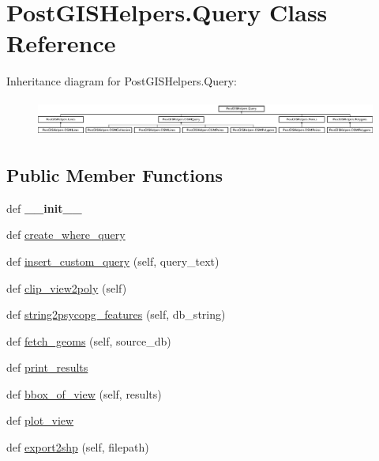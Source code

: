 \hypertarget{class_post_g_i_s_helpers_1_1_query}{}\section{Post\+G\+I\+S\+Helpers.\+Query Class Reference}
\label{class_post_g_i_s_helpers_1_1_query}
Inheritance diagram for Post\+G\+I\+S\+Helpers.\+Query\+:\begin{figure}[H]
\begin{center}
\leavevmode
\includegraphics[height=1.218274cm]{class_post_g_i_s_helpers_1_1_query}
\end{center}
\end{figure}
\subsection*{Public Member Functions}
\begin{DoxyCompactItemize}
\item 
\hypertarget{class_post_g_i_s_helpers_1_1_query_ae91481a4425fa5e713348e50de2b64da}{}def {\bfseries \+\_\+\+\_\+init\+\_\+\+\_\+}\label{class_post_g_i_s_helpers_1_1_query_ae91481a4425fa5e713348e50de2b64da}

\item 
def \hyperlink{class_post_g_i_s_helpers_1_1_query_a7b15a1e1045d7d422f00973e7995b9b7}{create\+\_\+where\+\_\+query}
\item 
def \hyperlink{class_post_g_i_s_helpers_1_1_query_a74b5b36b5b55e68b46243e80138706ab}{insert\+\_\+custom\+\_\+query} (self, query\+\_\+text)
\item 
def \hyperlink{class_post_g_i_s_helpers_1_1_query_a8cc7e86f8de045e5d96cc79676d3b273}{clip\+\_\+view2poly} (self)
\item 
def \hyperlink{class_post_g_i_s_helpers_1_1_query_a4812c3452ebfc2e42fe5d2d49c276ea4}{string2psycopg\+\_\+features} (self, db\+\_\+string)
\item 
def \hyperlink{class_post_g_i_s_helpers_1_1_query_aef1b7806337023919a4c21028f957f55}{fetch\+\_\+geoms} (self, source\+\_\+db)
\item 
def \hyperlink{class_post_g_i_s_helpers_1_1_query_a061572cc1f94289ea6ed18e029a39d11}{print\+\_\+results}
\item 
def \hyperlink{class_post_g_i_s_helpers_1_1_query_aab94f519185f5427498d8d672f80955a}{bbox\+\_\+of\+\_\+view} (self, results)
\item 
def \hyperlink{class_post_g_i_s_helpers_1_1_query_abe2e937630c1271f306721fffe1a133a}{plot\+\_\+view}
\item 
def \hyperlink{class_post_g_i_s_helpers_1_1_query_a21579a5070811c493975b6ac34b82672}{export2shp} (self, filepath)
\end{DoxyCompactItemize}
